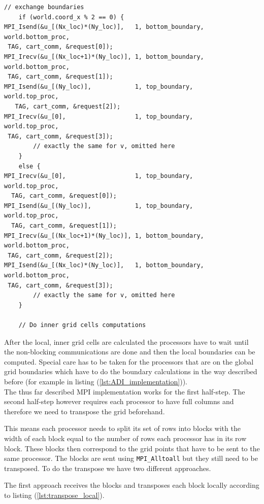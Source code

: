 \documentclass[11pt,a4paper]{article} %
\begin{document}
\begin{center}
\begin{verbatim}
// exchange boundaries
    if (world.coord_x % 2 == 0) {       
MPI_Isend(&u_[(Nx_loc)*(Ny_loc)],   1, bottom_boundary, world.bottom_proc,
 TAG, cart_comm, &request[0]);
MPI_Irecv(&u_[(Nx_loc+1)*(Ny_loc)], 1, bottom_boundary, world.bottom_proc,
 TAG, cart_comm, &request[1]);
MPI_Isend(&u_[(Ny_loc)],            1, top_boundary,    world.top_proc, 
   TAG, cart_comm, &request[2]);
MPI_Irecv(&u_[0],                   1, top_boundary,    world.top_proc,  
 TAG, cart_comm, &request[3]);
        // exactly the same for v, omitted here
    }
    else {      
MPI_Irecv(&u_[0],                   1, top_boundary,    world.top_proc,  
  TAG, cart_comm, &request[0]);
MPI_Isend(&u_[(Ny_loc)],            1, top_boundary,    world.top_proc,  
  TAG, cart_comm, &request[1]);
MPI_Irecv(&u_[(Nx_loc+1)*(Ny_loc)], 1, bottom_boundary, world.bottom_proc,
 TAG, cart_comm, &request[2]);
MPI_Isend(&u_[(Nx_loc)*(Ny_loc)],   1, bottom_boundary, world.bottom_proc,
 TAG, cart_comm, &request[3]);
        // exactly the same for v, omitted here
    }

	// Do inner grid cells computations
\end{verbatim}
\end{center}

After the local, inner grid cells are calculated the processors have to wait until the non-blocking communications are done and then the local boundaries can be computed.
Special care has to be taken for the processors that are on the global grid boundaries which have to do the boundary calculations in the way described before (for example in listing (\ref{lst:ADI_implementation})).
\\
The thus far described MPI implementation works for the first half-step.
The second half-step however requires each processor to have full columns and therefore we need to transpose the grid beforehand.

This means each processor needs to split its set of rows into blocks with the width of each block equal to the number of rows each processor has in its row block.
These blocks then correspond to the grid points that have to be sent to the same processor.
The blocks are sent using \texttt{MPI\_Alltoall} but they still need to be transposed.
To do the transpose we have two different approaches.

The first approach receives the blocks and transposes each block locally according to listing (\ref{lst:transpose_local}).
\end{document}
